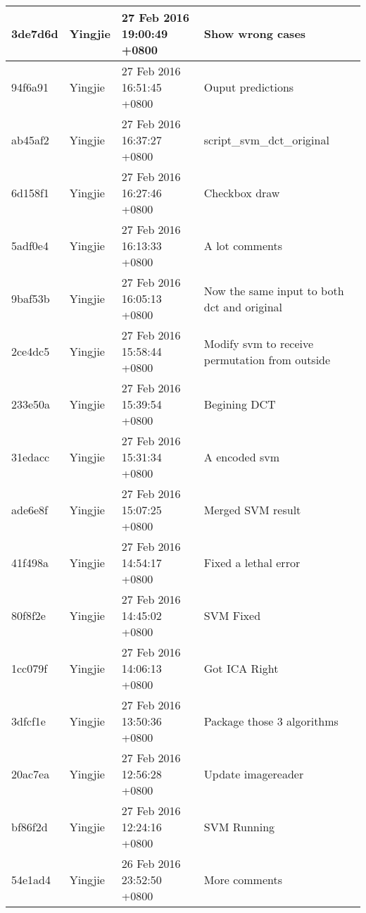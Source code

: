 \begin{longtable}{@{\extracolsep{\fill}}l|l|l|l@{}}
    3de7d6d  & Yingjie &  27 Feb 2016 19:00:49 +0800 & Show wrong cases                                     \\ \hline
    94f6a91  & Yingjie &  27 Feb 2016 16:51:45 +0800 & Ouput predictions                                    \\ \hline
    ab45af2  & Yingjie &  27 Feb 2016 16:37:27 +0800 & script\_svm\_dct\_original                           \\ \hline
    6d158f1  & Yingjie &  27 Feb 2016 16:27:46 +0800 & Checkbox draw                                        \\ \hline
    5adf0e4  & Yingjie &  27 Feb 2016 16:13:33 +0800 & A lot comments                                       \\ \hline
    9baf53b  & Yingjie &  27 Feb 2016 16:05:13 +0800 & Now the same input to both dct and original          \\ \hline
    2ce4dc5  & Yingjie &  27 Feb 2016 15:58:44 +0800 & Modify svm to receive permutation from outside       \\ \hline
    233e50a  & Yingjie &  27 Feb 2016 15:39:54 +0800 & Begining DCT                                         \\ \hline
    31edacc  & Yingjie &  27 Feb 2016 15:31:34 +0800 & A encoded svm                                        \\ \hline
    ade6e8f  & Yingjie &  27 Feb 2016 15:07:25 +0800 & Merged SVM  result                                   \\ \hline
    41f498a  & Yingjie &  27 Feb 2016 14:54:17 +0800 & Fixed a lethal error                                 \\ \hline
    80f8f2e  & Yingjie &  27 Feb 2016 14:45:02 +0800 & SVM Fixed                                            \\ \hline
    1cc079f  & Yingjie &  27 Feb 2016 14:06:13 +0800 & Got ICA Right                                        \\ \hline
    3dfcf1e  & Yingjie &  27 Feb 2016 13:50:36 +0800 & Package those 3 algorithms                           \\ \hline
    20ac7ea  & Yingjie &  27 Feb 2016 12:56:28 +0800 & Update imagereader                                   \\ \hline
    bf86f2d  & Yingjie &  27 Feb 2016 12:24:16 +0800 & SVM Running                                          \\ \hline
    54e1ad4  & Yingjie &  26 Feb 2016 23:52:50 +0800 & More comments                                        \\ \hline

\end{longtable}
